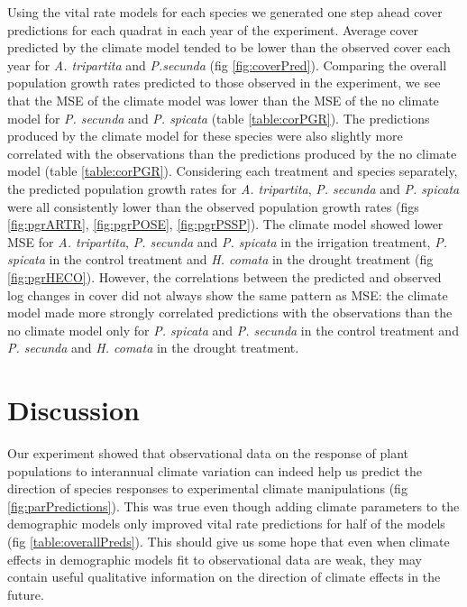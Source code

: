 \documentclass[11pt]{article}
\begin{document}
\begin{doublespacing}
Using the vital rate models for each species we generated one step ahead cover predictions for each quadrat in each year of the experiment.  Average cover predicted by the climate model tended to be lower than the observed cover each year for \textit{A. tripartita} and \textit{P.secunda} (fig \ref{fig:coverPred}). Comparing the overall population growth rates predicted to those observed in the experiment, we see that the MSE of the climate model was lower than the MSE of the no climate model for \textit{P. secunda} and \textit{P. spicata} (table \ref{table:corPGR}). The predictions produced by the climate model for these species were also slightly more correlated with the observations than the predictions produced by the no climate model (table \ref{table:corPGR}). Considering each treatment and species separately, the predicted population growth rates for \textit{A. tripartita}, \textit{P. secunda} and \textit{P. spicata} were all consistently lower than the observed population growth rates (figs \ref{fig:pgrARTR}, \ref{fig:pgrPOSE}, \ref{fig:pgrPSSP}). The climate model showed lower MSE for \textit{A. tripartita}, \textit{P. secunda} and \textit{P. spicata} in the irrigation treatment, \textit{P. spicata} in the control treatment and \textit{H. comata} in the drought treatment (fig \ref{fig:pgrHECO}).  However, the correlations between the predicted and observed log changes in cover did not always show the same pattern as MSE: the climate model made more strongly correlated predictions with the observations than the no climate model only for \textit{P. spicata} and \textit{P. secunda} in the control treatment and \textit{P. secunda} and \textit{H. comata} in the drought treatment. 
  

\section*{Discussion}

Our experiment showed that observational data on the response of plant populations to interannual climate variation can indeed help us predict the direction of species responses to experimental climate manipulations (fig \ref{fig:parPredictions}). This was true even though adding climate parameters to the demographic models only improved vital rate predictions for half of the models (fig \ref{table:overallPreds}). This should give us some hope that even when climate effects in demographic models fit to observational data are weak, they may contain useful qualitative information on the direction of climate effects in the future. 


\end{doublespacing}
\end{document}
